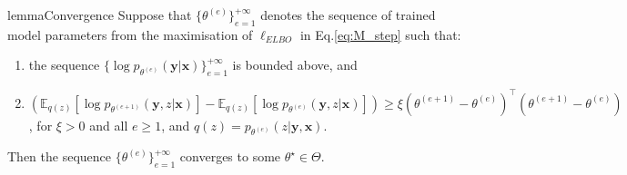 \documentclass[review]{elsarticle}
\theoremstyle{plain}
\begin{document}
\begin{restatable}[]{lemma}{Convergence}
    \label{thm:convergence}
    Suppose that $\{ \theta^{(e)}\}_{e=1}^{+\infty}$ denotes the sequence of trained model parameters from the maximisation of $\ell_{ELBO}$ in Eq.\ref{eq:M_step} such that:
    \begin{enumerate}
        \item the sequence $\{ \log p_{\theta^{(e)}}(\mathbf{y}|\mathbf{x})\}_{e=1}^{+\infty}$ is bounded above, and
        \item \footnotesize $\left(\mathbb{E}_{q(z)}[\log p_{\theta^{(e+1)}}(\mathbf{y},z|\mathbf{x})] - 
    \mathbb{E}_{q(z)}[\log p_{\theta^{(e)}}(\mathbf{y},z|\mathbf{x})]\right) \ge \xi \left(\theta^{(e+1)}-\theta^{(e)}\right)^{\top}\left(\theta^{(e+1)}-\theta^{(e)}\right)$, for $\xi>0$ and all $e \ge 1$, and $q(z)=p_{\theta^{(e)}}(z|\mathbf{y},\mathbf{x})$.  
    \end{enumerate}
    Then the sequence $\{\theta^{(e)}\}_{e=1}^{+\infty}$ converges to some $\theta^{\star} \in \Theta$.
 \end{restatable}
\end{document}
